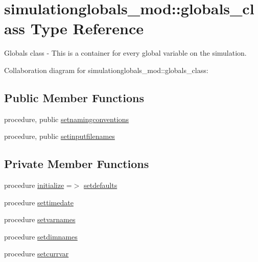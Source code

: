 \hypertarget{structsimulationglobals__mod_1_1globals__class}{}\section{simulationglobals\+\_\+mod\+:\+:globals\+\_\+class Type Reference}
\label{structsimulationglobals__mod_1_1globals__class}


Globals class -\/ This is a container for every global variable on the simulation.  




Collaboration diagram for simulationglobals\+\_\+mod\+:\+:globals\+\_\+class\+:
\subsection*{Public Member Functions}
\begin{DoxyCompactItemize}
\item 
procedure, public \mbox{\hyperlink{structsimulationglobals__mod_1_1globals__class_a3b33541d0f9a90c78d500b55ef452ee0}{setnamingconventions}}
\item 
procedure, public \mbox{\hyperlink{structsimulationglobals__mod_1_1globals__class_af3060e8a9597abde06dd5362625f5f4e}{setinputfilenames}}
\end{DoxyCompactItemize}
\subsection*{Private Member Functions}
\begin{DoxyCompactItemize}
\item 
procedure \mbox{\hyperlink{structsimulationglobals__mod_1_1globals__class_a3b8fe335ee4571c73b774cbbe37820cf}{initialize}} =$>$ \mbox{\hyperlink{namespacesimulationglobals__mod_aa01e0a958ef2e94a02991dcfe390bfa0}{setdefaults}}
\item 
procedure \mbox{\hyperlink{structsimulationglobals__mod_1_1globals__class_a9afa580356002f4a94376ad3f925cb35}{settimedate}}
\item 
procedure \mbox{\hyperlink{structsimulationglobals__mod_1_1globals__class_ac9fcf75928fccae1c6ac5c98603ed9b8}{setvarnames}}
\item 
procedure \mbox{\hyperlink{structsimulationglobals__mod_1_1globals__class_a4eb2eb6a506cf6cd16ac710cf7d5689c}{setdimnames}}
\item 
procedure \mbox{\hyperlink{structsimulationglobals__mod_1_1globals__class_ae1d8dcce038856889fec915c28a054ce}{setcurrvar}}
\end{DoxyCompactItemize}
